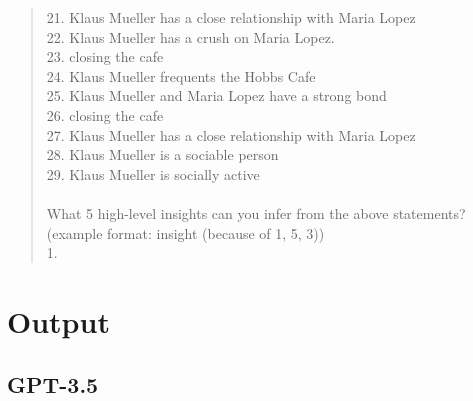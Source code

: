\begin{quote}
{		21. Klaus Mueller has a close relationship with Maria Lopez \\
		22. Klaus Mueller has a crush on Maria Lopez. \\
		23. closing the cafe \\
		24. Klaus Mueller frequents the Hobbs Cafe \\
		25. Klaus Mueller and Maria Lopez have a strong bond \\
		26. closing the cafe \\
		27. Klaus Mueller has a close relationship with Maria Lopez \\
		28. Klaus Mueller is a sociable person \\
		29. Klaus Mueller is socially active \\
		 \\
		What 5 high-level insights can you infer from the above statements? (example format: insight (because of 1, 5, 3)) \\
		1.
	}
\end{quote}
\newpage


\section{Output}

\subsection{GPT-3.5}

\begin{multicols}{2}
\begin{quote}
\end{quote}

\columnbreak

\begin{quote}
\end{quote}
\end{multicols}

\begin{multicols}{2}
\begin{quote}
\end{quote}

\columnbreak

\begin{quote}
\end{quote}
\end{multicols}
\newpage

